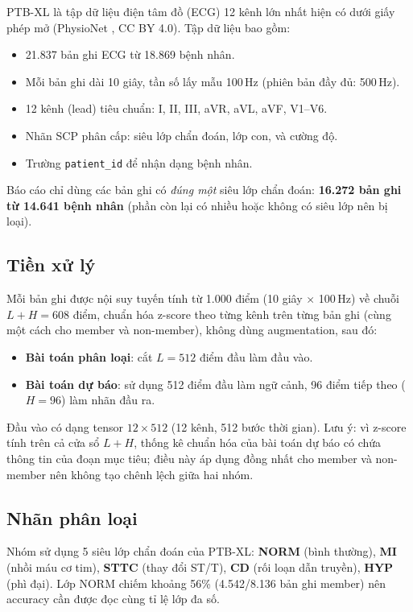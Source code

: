 \documentclass[12pt,a4paper]{report}
\begin{document}
PTB-XL \cite{ptbxl} là tập dữ liệu điện tâm đồ (ECG) 12 kênh lớn nhất hiện có dưới giấy phép mở (PhysioNet \cite{physionet}, CC BY 4.0). Tập dữ liệu bao gồm:
\begin{itemize}
  \item 21.837 bản ghi ECG từ 18.869 bệnh nhân.
  \item Mỗi bản ghi dài 10 giây, tần số lấy mẫu 100\,Hz (phiên bản đầy đủ: 500\,Hz).
  \item 12 kênh (lead) tiêu chuẩn: I, II, III, aVR, aVL, aVF, V1--V6.
  \item Nhãn SCP phân cấp: siêu lớp chẩn đoán, lớp con, và cường độ.
  \item Trường \texttt{patient\_id} để nhận dạng bệnh nhân.
\end{itemize}
Báo cáo chỉ dùng các bản ghi có \textit{đúng một} siêu lớp chẩn đoán: \textbf{16.272 bản ghi từ 14.641 bệnh nhân} (phần còn lại có nhiều hoặc không có siêu lớp nên bị loại).

\subsection{Tiền xử lý}

Mỗi bản ghi được nội suy tuyến tính từ 1.000 điểm (10 giây $\times$ 100\,Hz) về chuỗi $L + H = 608$ điểm, chuẩn hóa z-score theo từng kênh trên từng bản ghi (cùng một cách cho member và non-member), không dùng augmentation, sau đó:
\begin{itemize}
  \item \textbf{Bài toán phân loại}: cắt $L = 512$ điểm đầu làm đầu vào.
  \item \textbf{Bài toán dự báo}: sử dụng 512 điểm đầu làm ngữ cảnh, 96 điểm tiếp theo ($H = 96$) làm nhãn đầu ra.
\end{itemize}
Đầu vào có dạng tensor $12 \times 512$ (12 kênh, 512 bước thời gian). Lưu ý: vì z-score tính trên cả cửa sổ $L + H$, thống kê chuẩn hóa của bài toán dự báo có chứa thông tin của đoạn mục tiêu; điều này áp dụng đồng nhất cho member và non-member nên không tạo chênh lệch giữa hai nhóm.

\subsection{Nhãn phân loại}

Nhóm sử dụng 5 siêu lớp chẩn đoán của PTB-XL: \textbf{NORM} (bình thường), \textbf{MI} (nhồi máu cơ tim), \textbf{STTC} (thay đổi ST/T), \textbf{CD} (rối loạn dẫn truyền), \textbf{HYP} (phì đại). Lớp NORM chiếm khoảng 56\% (4.542/8.136 bản ghi member) nên accuracy cần được đọc cùng tỉ lệ lớp đa số.
\end{document}
